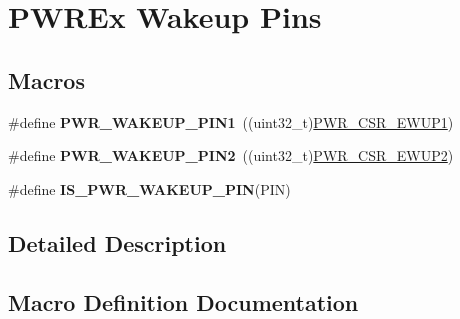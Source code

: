 \hypertarget{group___p_w_r_ex___wake_up___pins}{}\section{P\+W\+R\+Ex Wakeup Pins}
\label{group___p_w_r_ex___wake_up___pins}
\subsection*{Macros}
\begin{DoxyCompactItemize}
\item 
\mbox{\label{group___p_w_r_ex___wake_up___pins_ga0da8e7cbe0826e93b777ae4419a1cd05}} 
\#define {\bfseries P\+W\+R\+\_\+\+W\+A\+K\+E\+U\+P\+\_\+\+P\+I\+N1}~((uint32\+\_\+t)\hyperlink{group___peripheral___registers___bits___definition_ga2a92d9adb125e24ab1cd1a58a73efe19}{P\+W\+R\+\_\+\+C\+S\+R\+\_\+\+E\+W\+U\+P1})
\item 
\mbox{\label{group___p_w_r_ex___wake_up___pins_ga0c718de5967a8d2cec63d0b5fe0b2ada}} 
\#define {\bfseries P\+W\+R\+\_\+\+W\+A\+K\+E\+U\+P\+\_\+\+P\+I\+N2}~((uint32\+\_\+t)\hyperlink{group___peripheral___registers___bits___definition_ga3924963c0b869453e9be2b8f14c929dc}{P\+W\+R\+\_\+\+C\+S\+R\+\_\+\+E\+W\+U\+P2})
\item 
\#define {\bfseries I\+S\+\_\+\+P\+W\+R\+\_\+\+W\+A\+K\+E\+U\+P\+\_\+\+P\+IN}(P\+IN)
\end{DoxyCompactItemize}


\subsection{Detailed Description}


\subsection{Macro Definition Documentation}
\mbox{\label{group___p_w_r_ex___wake_up___pins_gac6fcc59d6ff95b8feda1b228517f9c3f}} 
